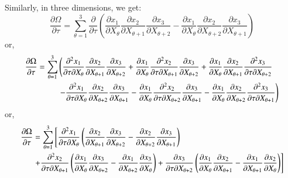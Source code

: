 \documentclass{warpdoc}
\newcommand{\alb}{\vspace{0.2cm}\\} %
\newcommand{\mfd}{\displaystyle}
\begin{document}
%
Similarly, in  three dimensions, we get:
%
\begin{equation}
  \frac{\partial \Omega}{\partial \tau}
  =\sum_{\theta=1}^3 \frac{\partial }{\partial \tau}
    \left(
       \frac{\partial x_1}{\partial X_\theta} \frac{\partial x_2}{\partial X_{\theta+1}} \frac{\partial x_3}{\partial X_{\theta+2}}
      -\frac{\partial x_1}{\partial X_\theta} \frac{\partial x_2}{\partial X_{\theta+2}} \frac{\partial x_3}{\partial X_{\theta+1}}
    \right)
\end{equation}
%
or,
%
\begin{align}
 \frac{\partial \Omega}{\partial \tau} =\sum_{\theta=1}^3
    &\left(
       \mfd\frac{\partial^2 x_1}{\partial \tau \partial X_\theta} \frac{\partial x_2}{\partial X_{\theta+1}} \frac{\partial x_3}{\partial X_{\theta+2}}
      +\frac{\partial x_1}{\partial X_\theta} \frac{\partial^2 x_2}{\partial \tau \partial X_{\theta+1}} \frac{\partial x_3}{\partial X_{\theta+2}}
      +\frac{\partial x_1}{\partial X_\theta} \frac{\partial x_2}{\partial X_{\theta+1}} \frac{\partial^2 x_3}{\partial \tau \partial X_{\theta+2}}\right. \nonumber\alb\mfd
      &\left.-\mfd\frac{\partial^2 x_1}{\partial \tau \partial X_\theta} \frac{\partial x_2}{\partial X_{\theta+2}} \frac{\partial x_3}{\partial X_{\theta+1}}
      -\frac{\partial x_1}{\partial X_\theta} \frac{\partial^2 x_2}{\partial \tau \partial X_{\theta+2}} \frac{\partial x_3}{\partial X_{\theta+1}}
      -\frac{\partial x_1}{\partial X_\theta} \frac{\partial x_2}{\partial X_{\theta+2}} \frac{\partial^2 x_3}{\partial \tau \partial X_{\theta+1}}
    \right)
\end{align}
%
or,
%
\begin{align}
   \frac{\partial \Omega}{\partial \tau}&=\sum_{\theta=1}^3
    \left[
       \frac{\partial^2 x_1}{\partial \tau \partial X_\theta}
         \left(
           \frac{\partial x_2}{\partial X_{\theta+1}} \frac{\partial x_3}{\partial X_{\theta+2}}
          -\frac{\partial x_2}{\partial X_{\theta+2}} \frac{\partial x_3}{\partial X_{\theta+1}}
         \right) \right. \nonumber\alb
      &\left.+\frac{\partial^2 x_2}{\partial \tau \partial X_{\theta+1}}
         \left(
           \frac{\partial x_1}{\partial X_\theta}\frac{\partial x_3}{ \partial X_{\theta+2}}
          -\frac{\partial x_1}{\partial X_{\theta+2}}\frac{\partial x_3}{\partial X_{\theta}}
         \right)   +\frac{\partial x_3}{\partial \tau \partial X_{\theta+2}}
         \left(
           \frac{\partial x_1}{\partial X_\theta} \frac{\partial x_2}{\partial X_{\theta+1}}
          -\frac{\partial x_1}{\partial X_{\theta+1}} \frac{\partial x_2}{\partial X_{\theta}}
         \right)
    \right]
\end{align}
\end{document}
